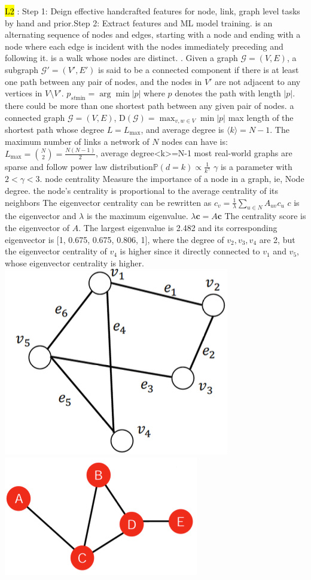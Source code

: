 \hl{L2} : Step 1: Deign effective handcrafted features for node, link, graph level tasks by hand and prior.Step 2: Extract features and ML model training. 
 is an alternating sequence of nodes and edges, starting with a node and ending with a node where each edge is incident with the nodes immediately preceding and following it.
 is a walk whose nodes are distinct. 
. Given a graph \( \mathcal{G} = (V, E) \), a subgraph \( \mathcal{G}' = (V', E') \) is said to be a connected component if there is at least one path between any pair of nodes, and the nodes in \( V' \) are not adjacent to any vertices in \( V \setminus V' \).
 \( p_{st\text{min}} = \arg\min |p| \) where \( p \) denotes the path with length \( |p| \). there could be more than one shortest path between any given pair of nodes.
 a connected graph \( \mathcal{G} = (V, E) \), \( \text{D}(\mathcal{G}) = \max_{v, w \in V} \min|p| \) max length of the shortest path
 whose degree \( L = L_{\text{max}} \), and average degree is \( \langle k \rangle = N - 1 \).
    The maximum number of links a network of \( N \) nodes can have is:
    \( L_{\text{max}} = \binom{N}{2} = \frac{N(N - 1)}{2} \), average degree<k>=N-1
 most real-world graphs are sparse and follow power law distribution\({\mathbb  {P}}(d=k)\propto {\frac  {1}{k^{{\gamma }}}}\) \( \gamma \) is a parameter with \( 2 < \gamma < 3 \).
 node centrality Measure the importance of a node in a graph, ie, Node degree.  the node’s centrality is proportional to the average centrality of its neighbors The eigenvector centrality can be rewritten as
\(c_v = \frac{1}{\lambda} \sum_{u \in N} A_{uv} c_u\)
\( c \) is the eigenvector and \( \lambda \) is the maximum eigenvalue. \( \lambda \mathbf{c} = A \mathbf{c} \) The centrality score is the eigenvector of \( A \). 
 The largest eigenvalue is 2.482 and its corresponding eigenvector is [1, 0.675, 0.675, 0.806, 1], where the degree of \(v_2, v_3, v_4\) are 2, but the eigenvector centrality of \(v_4\) is higher since it directly connected to \(v_1\) and \(v_5\), whose eigenvector centrality is higher.
 \includegraphics[height=0.025\textwidth]{figs/l2-4.png}
 \includegraphics[height=0.025\textwidth]{figs/l2-5.png}
